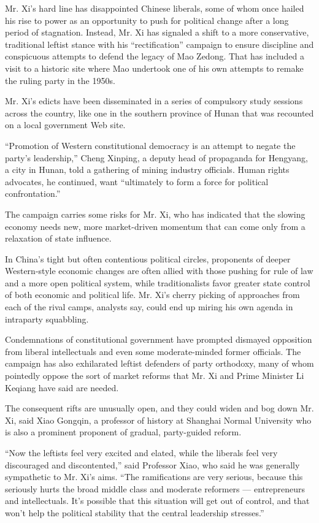 Mr. Xi's hard line has disappointed Chinese liberals, some of whom once
hailed his rise to power as an opportunity to push for political change
after a long period of stagnation. Instead, Mr. Xi has signaled a shift
to a more conservative, traditional leftist stance with his
``rectification'' campaign to ensure discipline and conspicuous attempts
to defend the legacy of Mao Zedong. That has included a visit to a
historic site where Mao undertook one of his own attempts to remake the
ruling party in the 1950s.

Mr. Xi's edicts have been disseminated in a series of compulsory study
sessions across the country, like one in the southern province of Hunan
that was recounted on a local government Web site.

``Promotion of Western constitutional democracy is an attempt to negate
the party's leadership,'' Cheng Xinping, a deputy head of propaganda for
Hengyang, a city in Hunan, told a gathering of mining industry
officials. Human rights advocates, he continued, want ``ultimately to
form a force for political confrontation.''

The campaign carries some risks for Mr. Xi, who has indicated that the
slowing economy needs new, more market-driven momentum that can come
only from a relaxation of state influence.

In China's tight but often contentious political circles, proponents of
deeper Western-style economic changes are often allied with those
pushing for rule of law and a more open political system, while
traditionalists favor greater state control of both economic and
political life. Mr. Xi's cherry picking of approaches from each of the
rival camps, analysts say, could end up miring his own agenda in
intraparty squabbling.

Condemnations of constitutional government have prompted dismayed
opposition from liberal intellectuals and even some moderate-minded
former officials. The campaign has also exhilarated leftist defenders of
party orthodoxy, many of whom pointedly oppose the sort of market
reforms that Mr. Xi and Prime Minister Li Keqiang have said are needed.

The consequent rifts are unusually open, and they could widen and bog
down Mr. Xi, said Xiao Gongqin, a professor of history at Shanghai
Normal University who is also a prominent proponent of gradual,
party-guided reform.

``Now the leftists feel very excited and elated, while the liberals feel
very discouraged and discontented,'' said Professor Xiao, who said he
was generally sympathetic to Mr. Xi's aims. ``The ramifications are very
serious, because this seriously hurts the broad middle class and
moderate reformers --- entrepreneurs and intellectuals. It's possible
that this situation will get out of control, and that won't help the
political stability that the central leadership stresses.''

